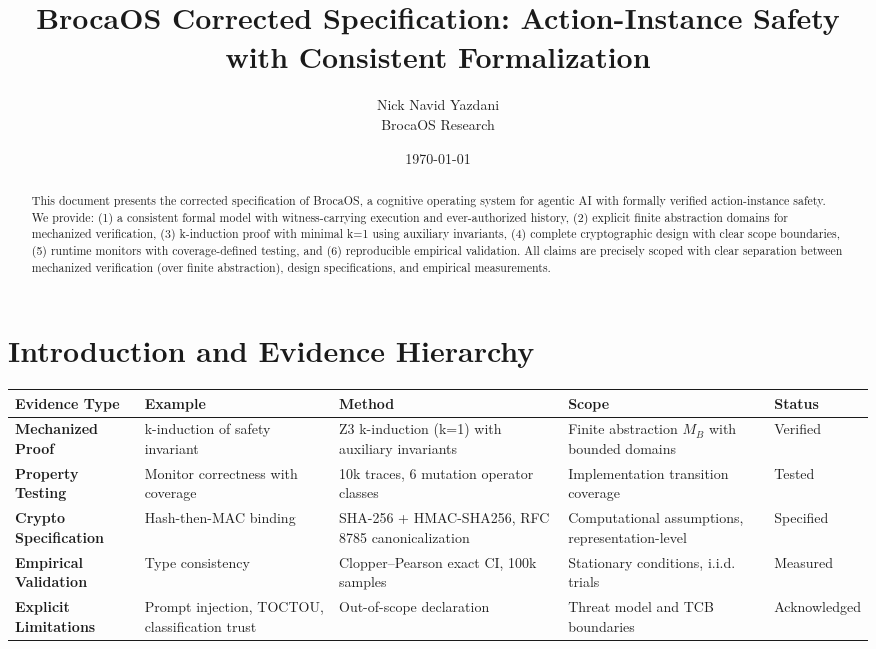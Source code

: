 \documentclass[12pt]{article}
\title{BrocaOS Corrected Specification: Action-Instance Safety with Consistent Formalization}
\author{Nick Navid Yazdani\\BrocaOS Research}
\date{\today}
\begin{document}
\maketitle

\begin{abstract}
This document presents the corrected specification of BrocaOS, a cognitive operating system for agentic AI with formally verified action-instance safety. We provide: (1) a consistent formal model with witness-carrying execution and ever-authorized history, (2) explicit finite abstraction domains for mechanized verification, (3) k-induction proof with minimal k=1 using auxiliary invariants, (4) complete cryptographic design with clear scope boundaries, (5) runtime monitors with coverage-defined testing, and (6) reproducible empirical validation. All claims are precisely scoped with clear separation between mechanized verification (over finite abstraction), design specifications, and empirical measurements.
\end{abstract}

\section{Introduction and Evidence Hierarchy}

\begin{center}
\small
\begin{tabular}{@{}p{}p{}p{}p{}p{}@{}}
\toprule
\textbf{Evidence Type} & \textbf{Example} & \textbf{Method} & \textbf{Scope} & \textbf{Status} \\
\midrule
\textbf{Mechanized Proof} & k-induction of safety invariant & Z3 k-induction (k=1) with auxiliary invariants & Finite abstraction $M_B$ with bounded domains & Verified \\
\textbf{Property Testing} & Monitor correctness with coverage & 10k traces, 6 mutation operator classes & Implementation transition coverage & Tested \\
\textbf{Crypto Specification} & Hash-then-MAC binding & SHA-256 + HMAC-SHA256, RFC 8785 canonicalization & Computational assumptions, representation-level & Specified \\
\textbf{Empirical Validation} & Type consistency & Clopper--Pearson exact CI, 100k samples & Stationary conditions, i.i.d. trials & Measured \\
\textbf{Explicit Limitations} & Prompt injection, TOCTOU, classification trust & Out-of-scope declaration & Threat model and TCB boundaries & Acknowledged \\
\bottomrule
\end{tabular}
\end{center}
\end{document}
